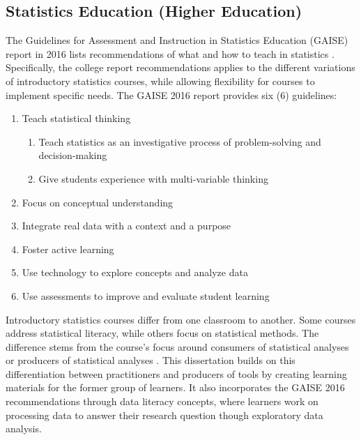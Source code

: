 \documentclass[010-intro.tex]{subfiles}
\begin{document}
\subsection{Statistics Education (Higher Education)}

    The Guidelines for Assessment and Instruction in Statistics Education (GAISE) report in 2016 lists
    recommendations of what and how to teach in statistics
    \cite{gaise2016}.
    Specifically, the college report recommendations
    applies to the different variations of introductory statistics courses,
    while allowing flexibility for courses to implement specific needs.
    The GAISE 2016 report provides six (6) guidelines:

    \begin{enumerate}
        \item Teach statistical thinking
        \begin{enumerate}
            \item Teach statistics as an investigative process of problem-solving and decision-making
            \item Give students experience with multi-variable thinking
        \end{enumerate}
        \item Focus on conceptual understanding
        \item Integrate real data with a context and a purpose
        \item Foster active learning
        \item Use technology to explore concepts and analyze data
        \item Use assessments to improve and evaluate student learning
    \end{enumerate}

    Introductory statistics courses differ from one classroom to another.
    Some courses address statistical literacy,
    while others focus on statistical methods.
    The difference stems from the course's focus around consumers of statistical analyses
    or producers of statistical analyses
    \cite{gaise2016}.
    This dissertation builds on this differentiation between practitioners and producers of tools
    by creating learning materials for the former group of learners.
    It also incorporates the GAISE 2016 recommendations through data literacy concepts,
    where learners work on processing data to answer their research question though exploratory data analysis.
\end{document}
